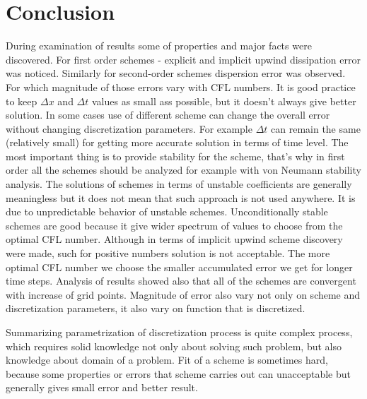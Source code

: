 
\chapter{Conclusion}
	During examination of results some of properties and major facts were discovered. For first order schemes - explicit and implicit upwind dissipation error was noticed. Similarly for second-order schemes dispersion error was observed. For which magnitude of those errors vary with CFL numbers. It is good practice to keep $\Delta x$ and $\Delta t$ values as small ass possible, but it doesn't always give better solution. In some cases use of different scheme can change the overall error without changing discretization parameters. For example $\Delta t$ can remain the same (relatively small) for getting more accurate solution in terms of time level. The most important thing is to provide stability for the scheme, that's why in first order all the schemes should be analyzed for example with von Neumann stability analysis. The solutions of schemes in terms of unstable coefficients are generally meaningless but it does not mean that such approach is not used anywhere. It is due to unpredictable behavior of unstable schemes. Unconditionally stable schemes are good because it give wider spectrum of values to choose from the optimal CFL number. Although in terms of implicit upwind scheme discovery were made, such for positive numbers solution is not acceptable. The more optimal CFL number we choose the smaller accumulated error we get for longer time steps. Analysis of results showed also that all of the schemes are convergent with increase of grid points. Magnitude of error also vary not only on scheme and discretization parameters, it also vary on function that is discretized.
	
	Summarizing parametrization of discretization process is quite complex process, which requires solid knowledge not only about solving such problem, but also knowledge about domain of a problem. Fit of a scheme is sometimes hard, because some properties or errors that scheme carries out can unacceptable but generally gives small error and better result.  